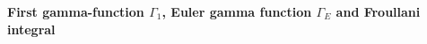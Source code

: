 


 \def\p{\partial}
\def\t {\tilde}
\def \m {\medskip}
\def\degree {{\bf {\rm degree}\,\,}}
\def \finish {${\,\,\vrule height1mm depth2mm width 8pt}$}





\def\a {\alpha}
\def\vare{{\varepsilon}}
\def\l {\lambda}
\def\s {{\sigma}}

\def\G {{\Gamma}}

\def\A {{\bf A}}
\def\C {{\bf C}}
\def\E  {{\bf E}}
\def\K {{\bf K}}
\def\N {{\bf N}}
\def\Q {{\bf Q}}
\def\R  {{\bf R}}
\def\V {{\cal V}}
\def \X   {{\bf X}}
\def \Y   {{\bf Y}}
\def\Z {{\bf Z}}



\def\ac {{\bf a}}
\def\e{{\bf e}}
\def\f {{\bf f}}
\def\n {{\bf n}}
\def\r {{\bf r}}
\def\v {{\bf v}}
\def \x   {{\bf x}}
\def \y   {{\bf y}}


\def\pt {{\bf pt}}



\centerline {\bf First gamma-function $\G_1$, 
Euler gamma function $\G_E$ and Froullani integral}

